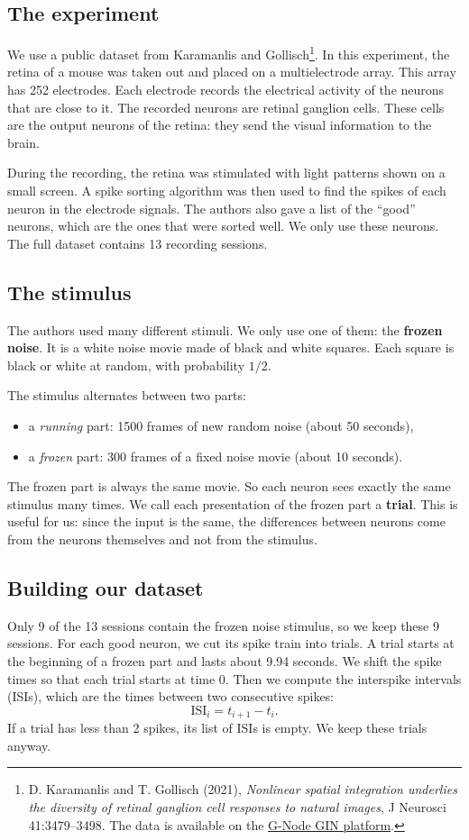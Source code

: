 \documentclass[11pt,a4paper]{article}
\begin{document}
\subsection{The experiment}
We use a public dataset from Karamanlis and Gollisch\footnote{D. Karamanlis and T. Gollisch (2021), \textit{Nonlinear spatial integration underlies the diversity of retinal ganglion cell responses to natural images}, J Neurosci 41:3479--3498. The data is available on the \href{https://gin.g-node.org/gollischlab/Karamanlis_Gollisch_2021_RGC_spiketrains_natural_image_encoding}{G-Node GIN platform}.}. In this experiment, the retina of a mouse was taken out and placed on a multielectrode array. This array has 252 electrodes. Each electrode records the electrical activity of the neurons that are close to it. The recorded neurons are retinal ganglion cells. These cells are the output neurons of the retina: they send the visual information to the brain.

During the recording, the retina was stimulated with light patterns shown on a small screen. A spike sorting algorithm was then used to find the spikes of each neuron in the electrode signals. The authors also gave a list of the ``good'' neurons, which are the ones that were sorted well. We only use these neurons. The full dataset contains 13 recording sessions.

\subsection{The stimulus}
The authors used many different stimuli. We only use one of them: the \textbf{frozen noise}. It is a white noise movie made of black and white squares. Each square is black or white at random, with probability $1/2$.

The stimulus alternates between two parts:
\begin{itemize}
    \item a \textit{running} part: 1500 frames of new random noise (about 50 seconds),
    \item a \textit{frozen} part: 300 frames of a fixed noise movie (about 10 seconds).
\end{itemize}
The frozen part is always the same movie. So each neuron sees exactly the same stimulus many times. We call each presentation of the frozen part a \textbf{trial}. This is useful for us: since the input is the same, the differences between neurons come from the neurons themselves and not from the stimulus.

\subsection{Building our dataset}
Only 9 of the 13 sessions contain the frozen noise stimulus, so we keep these 9 sessions. For each good neuron, we cut its spike train into trials. A trial starts at the beginning of a frozen part and lasts about 9.94 seconds. We shift the spike times so that each trial starts at time 0. Then we compute the interspike intervals (ISIs), which are the times between two consecutive spikes:
\[
    \text{ISI}_i = t_{i+1} - t_i .
\]
If a trial has less than 2 spikes, its list of ISIs is empty. We keep these trials anyway.
\end{document}
